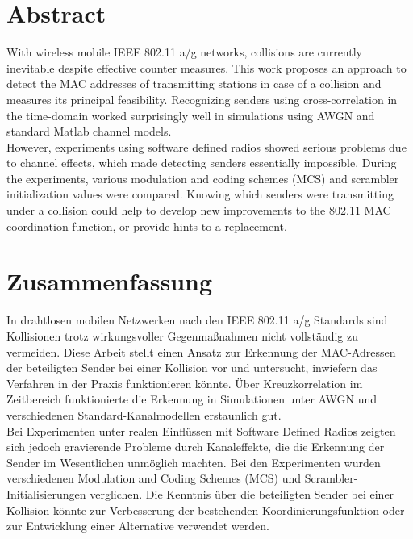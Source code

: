 

\begingroup
\let\clearpage\relax
\let\cleardoublepage\relax
\let\cleardoublepage\relax

\chapter*{Abstract}

With wireless mobile IEEE 802.11 a/g networks, collisions are currently inevitable despite effective counter measures. This work proposes an approach to detect the MAC addresses of transmitting stations in case of a collision and measures its principal feasibility. Recognizing senders using cross-correlation in the time-domain worked surprisingly well in simulations using AWGN and standard Matlab channel models.\\

However, experiments using software defined radios showed serious problems due to channel effects, which made detecting senders essentially impossible. During the experiments, various modulation and coding schemes (MCS) and scrambler initialization values were compared. Knowing which senders were transmitting under a collision could help to develop new improvements to the 802.11 MAC coordination function, or provide hints to a replacement.



\vfill
{}
\chapter*{Zusammenfassung}

In drahtlosen mobilen Netzwerken nach den IEEE 802.11 a/g Standards sind Kollisionen trotz wirkungsvoller Gegenmaßnahmen nicht vollständig zu vermeiden. Diese Arbeit stellt einen Ansatz zur Erkennung der MAC-Adressen der beteiligten Sender bei einer Kollision vor und untersucht, inwiefern das Verfahren in der Praxis funktionieren könnte. Über Kreuzkorrelation im Zeitbereich funktionierte die Erkennung in Simulationen unter AWGN und verschiedenen Standard-Kanalmodellen erstaunlich gut.\\

\noindent Bei Experimenten unter realen Einflüssen mit Software Defined Radios zeigten sich jedoch gravierende Probleme durch Kanaleffekte, die die Erkennung der Sender im Wesentlichen unmöglich machten. Bei den Experimenten wurden verschiedenen Modulation and Coding Schemes (MCS) und Scrambler-Initialisierungen verglichen. Die Kenntnis über die beteiligten Sender bei einer Kollision könnte zur Verbesserung der bestehenden Koordinierungsfunktion oder zur Entwicklung einer Alternative verwendet werden.


\endgroup
\vfill
